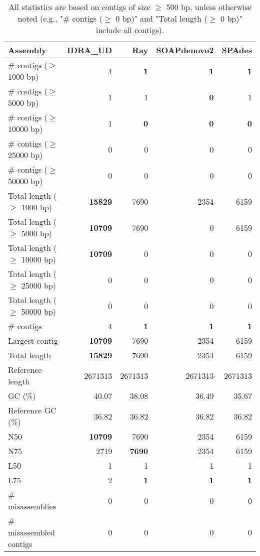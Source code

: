 \documentclass[12pt,a4paper]{article}
\begin{document}
\begin{table}[ht]
\begin{center}
\caption{All statistics are based on contigs of size $\geq$ 500 bp, unless otherwise noted (e.g., "\# contigs ($\geq$ 0 bp)" and "Total length ($\geq$ 0 bp)" include all contigs).}
\begin{tabular}{|l*{4}{|r}|}
\hline
Assembly & IDBA\_UD & Ray & SOAPdenovo2 & SPAdes \\ \hline
\# contigs ($\geq$ 1000 bp) & 4 & {\bf 1} & {\bf 1} & {\bf 1} \\ \hline
\# contigs ($\geq$ 5000 bp) & 1 & 1 & {\bf 0} & 1 \\ \hline
\# contigs ($\geq$ 10000 bp) & 1 & {\bf 0} & {\bf 0} & {\bf 0} \\ \hline
\# contigs ($\geq$ 25000 bp) & 0 & 0 & 0 & 0 \\ \hline
\# contigs ($\geq$ 50000 bp) & 0 & 0 & 0 & 0 \\ \hline
Total length ($\geq$ 1000 bp) & {\bf 15829} & 7690 & 2354 & 6159 \\ \hline
Total length ($\geq$ 5000 bp) & {\bf 10709} & 7690 & 0 & 6159 \\ \hline
Total length ($\geq$ 10000 bp) & {\bf 10709} & 0 & 0 & 0 \\ \hline
Total length ($\geq$ 25000 bp) & 0 & 0 & 0 & 0 \\ \hline
Total length ($\geq$ 50000 bp) & 0 & 0 & 0 & 0 \\ \hline
\# contigs & 4 & {\bf 1} & {\bf 1} & {\bf 1} \\ \hline
Largest contig & {\bf 10709} & 7690 & 2354 & 6159 \\ \hline
Total length & {\bf 15829} & 7690 & 2354 & 6159 \\ \hline
Reference length & 2671313 & 2671313 & 2671313 & 2671313 \\ \hline
GC (\%) & 40.07 & 38.08 & 36.49 & 35.67 \\ \hline
Reference GC (\%) & 36.82 & 36.82 & 36.82 & 36.82 \\ \hline
N50 & {\bf 10709} & 7690 & 2354 & 6159 \\ \hline
N75 & 2719 & {\bf 7690} & 2354 & 6159 \\ \hline
L50 & 1 & 1 & 1 & 1 \\ \hline
L75 & 2 & {\bf 1} & {\bf 1} & {\bf 1} \\ \hline
\# misassemblies & 0 & 0 & 0 & 0 \\ \hline
\# misassembled contigs & 0 & 0 & 0 & 0 \\ \hline

\end{tabular}
\end{center}
\end{table}
\end{document}
